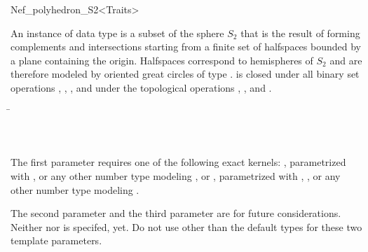 
\begin{ccRefClass}{Nef_polyhedron_S2<Traits>}
  
\ccDefinition

An instance of data type  is a subset of
the sphere $S_2$ that is the result of forming complements and 
intersections starting from a finite set  of halfspaces 
bounded by a plane containing the origin. Halfspaces correspond to 
hemispheres of $S_2$ and are therefore modeled by oriented great 
circles of type .  is 
closed under all binary set operations , ,
,  and under the topological
operations , , and .


\ccParameters

\begin{tabbing}
 \=\\
                 \>\\
                 \>\\
\end{tabbing}

The first parameter requires one of the following exact kernels:
,  
parametrized with ,  or any other number type
modeling \Z, or ,  parametrized with 
, , or any other number 
type modeling \Q.

The second parameter and the third parameter are for future considerations.
Neither  nor  is
specifed, yet. Do not use other than the default types for these two 
template parameters.

\ccThreeToTwo

\ccTypes

\ccGlue
{}
\ccGlue
{}


\end{ccRefClass}
